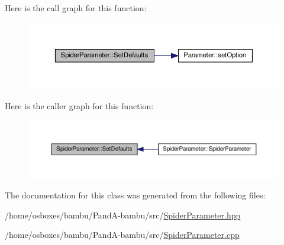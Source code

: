 Here is the call graph for this function\+:
\nopagebreak
\begin{figure}[H]
\begin{center}
\leavevmode
\includegraphics[width=350pt]{dc/d95/classSpiderParameter_afbc320968099098b78d33aa2b36667c1_cgraph}
\end{center}
\end{figure}
Here is the caller graph for this function\+:
\nopagebreak
\begin{figure}[H]
\begin{center}
\leavevmode
\includegraphics[width=350pt]{dc/d95/classSpiderParameter_afbc320968099098b78d33aa2b36667c1_icgraph}
\end{center}
\end{figure}


The documentation for this class was generated from the following files\+:\begin{DoxyCompactItemize}
\item 
/home/osboxes/bambu/\+Pand\+A-\/bambu/src/\hyperlink{SpiderParameter_8hpp}{Spider\+Parameter.\+hpp}\item 
/home/osboxes/bambu/\+Pand\+A-\/bambu/src/\hyperlink{SpiderParameter_8cpp}{Spider\+Parameter.\+cpp}\end{DoxyCompactItemize}
